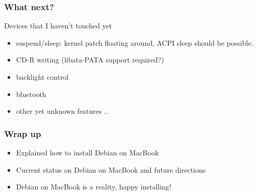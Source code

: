 \documentclass[cjk,dvipdfm]{beamer}
\begin{document}
\begin{frame}
\frametitle{What next?}
Devices that I haven't touched yet
\begin{itemize}
 \item suspend/sleep: kernel patch floating around, ACPI sleep should be possible.
 \item CD-R writing (libata-PATA support required?)
 \item backlight control
 \item bluetooth
 \item other yet unknown features ..
\end{itemize}
\end{frame}

\begin{frame}
\frametitle{Wrap up}
\begin{itemize}[<+->]
 \item Explained how to install Debian on MacBook
 \item Current status on Debian on MacBook and future directions
 \item Debian on MacBook is a reality, happy installing!
\end{itemize}
\end{frame}
\end{document}
